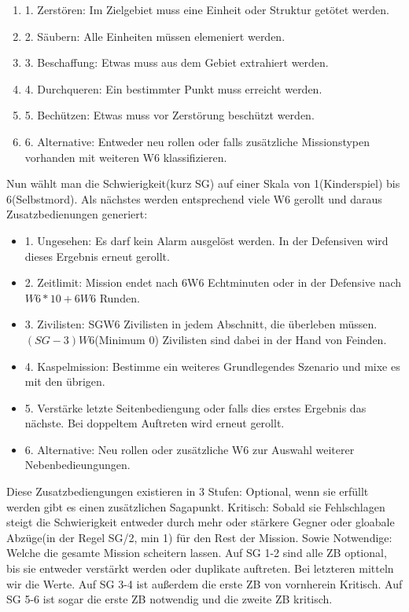\documentclass[twoside,a4paper]{minimal}
\begin{document}
\begin{multicols*}{3}
\begin{enumerate}
\item 1. Zerstören: Im Zielgebiet muss eine Einheit oder Struktur getötet werden.
\item 2. Säubern: Alle Einheiten müssen elemeniert werden.
\item 3. Beschaffung: Etwas muss aus dem Gebiet extrahiert werden.
\item 4. Durchqueren: Ein bestimmter Punkt muss erreicht werden.
\item 5. Bechützen: Etwas muss vor Zerstörung beschützt werden.
\item 6. Alternative: Entweder neu rollen oder falls zusätzliche Missionstypen vorhanden mit weiteren W6 klassifizieren.
\end{enumerate}
Nun wählt man die Schwierigkeit(kurz SG) auf einer Skala von 1(Kinderspiel) bis 6(Selbstmord). Als nächstes werden entsprechend viele W6 gerollt und daraus Zusatzbedienungen generiert:
\begin{itemize}
\item 1. Ungesehen: Es darf kein Alarm ausgelöst werden. In der Defensiven wird dieses Ergebnis erneut gerollt.
\item 2. Zeitlimit: Mission endet nach 6W6 Echtminuten oder in der Defensive nach $W6*10+6W6$ Runden.
\item 3. Zivilisten: SGW6 Zivilisten in jedem Abschnitt, die überleben müssen. $(SG-3)W6$(Minimum 0) Zivilisten sind dabei in der Hand von Feinden.
\item 4. Kaspelmission: Bestimme ein weiteres Grundlegendes Szenario und mixe es mit den übrigen.
\item 5. Verstärke letzte Seitenbediengung oder falls dies erstes Ergebnis das nächste. Bei doppeltem Auftreten wird erneut gerollt.
\item 6. Alternative: Neu rollen oder zusätzliche W6 zur Auswahl weiterer Nebenbedieungungen.
\end{itemize} 
Diese Zusatzbediengungen existieren in 3 Stufen: Optional, wenn sie erfüllt werden gibt es einen zusätzlichen Sagapunkt. Kritisch: Sobald sie Fehlschlagen steigt die Schwierigkeit entweder durch mehr oder stärkere Gegner oder gloabale Abzüge(in der Regel SG/2, min 1) für den Rest der Mission. Sowie Notwendige: Welche die gesamte Mission scheitern lassen. Auf SG 1-2 sind alle ZB optional, bis sie entweder verstärkt werden oder duplikate auftreten. Bei letzteren mitteln wir die Werte. Auf SG 3-4 ist außerdem die erste ZB von vornherein Kritisch. Auf SG 5-6 ist sogar die erste ZB notwendig und die zweite ZB kritisch.

\end{multicols*}
\end{document}
